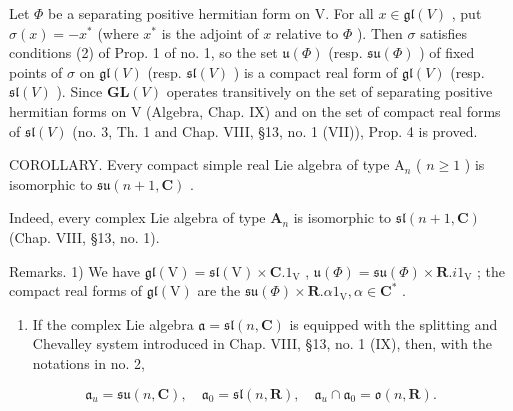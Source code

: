 Let \(\varPhi\) be a separating positive hermitian form on V. For all \(x\in\mathfrak{gl}(V)\) , put \(\sigma(x)=-x^{*}\) (where \(x^{*}\) is the adjoint of \(x\) relative to \(\varPhi\) ). Then \(\sigma\) satisfies conditions (2) of Prop. 1 of no. 1, so the set \(\mathfrak{u}(\varPhi)\) (resp. \(\mathfrak{su}(\varPhi)\) ) of fixed points of \(\sigma\) on \(\mathfrak{gl}(V)\) (resp. \(\mathfrak{sl}(V)\) ) is a compact real form of \(\mathfrak{gl}(V)\) (resp. \(\mathfrak{sl}(V)\) ). Since \(\mathbf{GL}(V)\) operates transitively on the set of separating positive hermitian forms on V (Algebra, Chap. IX) and on the set of compact real forms of \(\mathfrak{sl}(V)\) (no. 3, Th. 1 and Chap. VIII, §13, no. 1 (VII)), Prop. 4 is proved.

COROLLARY. Every compact simple real Lie algebra of type \(\mathrm{A}_n\) ( \(n \geq 1\) ) is isomorphic to \(\mathfrak{su}(n + 1, \mathbf{C})\) .

Indeed, every complex Lie algebra of type \(\mathbf{A}_n\) is isomorphic to \(\mathfrak{sl}(n + 1,\mathbf{C})\) (Chap. VIII, §13, no. 1).

Remarks. 1) We have \(\mathfrak{gl}(\mathrm{V}) = \mathfrak{sl}(\mathrm{V}) \times \mathbf{C}.1_{\mathrm{V}}\) , \(\mathfrak{u}(\varPhi) = \mathfrak{su}(\varPhi) \times \mathbf{R}.i1_{\mathrm{V}}\) ; the compact real forms of \(\mathfrak{gl}(\mathrm{V})\) are the \(\mathfrak{su}(\varPhi) \times \mathbf{R}. \alpha 1_{\mathrm{V}}, \alpha \in \mathbf{C}^*\) .

\begin{enumerate}
\def\labelenumi{\arabic{enumi})}
\setcounter{enumi}{1}
\tightlist
\item
  If the complex Lie algebra \(\mathfrak{a} = \mathfrak{sl}(n,\mathbf{C})\) is equipped with the splitting and Chevalley system introduced in Chap. VIII, §13, no. 1 (IX), then, with the notations in no. 2,
\end{enumerate}

\[
\mathfrak {a} _ {u} = \mathfrak {s u} (n, \mathbf {C}), \quad \mathfrak {a} _ {0} = \mathfrak {s l} (n, \mathbf {R}), \quad \mathfrak {a} _ {u} \cap \mathfrak {a} _ {0} = \mathfrak {o} (n, \mathbf {R}).
\]

